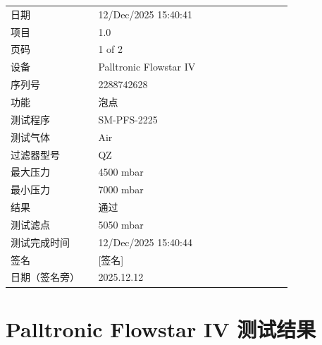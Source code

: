 \documentclass[UTF8,10pt,a4paper,fontset=fandol]{ctexart}
\newcommand{\fieldvalue}[1]{#1}
\newcommand{\handwritten}[1]{#1}
\begin{document}
\begin{tabular}{@{}p{0.28\linewidth}p{0.62\linewidth}@{}}
日期 &
\fieldvalue{12/Dec/2025 15:40:41}
\\
项目 &
\fieldvalue{1.0}
\\
页码 &
\fieldvalue{1 of 2}
\\
设备 &
\fieldvalue{Palltronic Flowstar IV}
\\
序列号 &
\fieldvalue{2288742628}
\\
功能 &
\fieldvalue{泡点}
\\
测试程序 &
\fieldvalue{SM-PFS-2225}
\\
测试气体 &
\fieldvalue{Air}
\\
过滤器型号 &
\fieldvalue{QZ}
\\
最大压力 &
\fieldvalue{4500 mbar}
\\
最小压力 &
\fieldvalue{7000 mbar}
\\
结果 &
\fieldvalue{通过}
\\
测试滤点 &
\fieldvalue{5050 mbar}
\\
测试完成时间 &
\fieldvalue{12/Dec/2025 15:40:44}
\\
签名 &
\fieldvalue{\handwritten{[签名]}}
\\
日期（签名旁） &
\fieldvalue{\handwritten{2025.12.12}}
\end{tabular}

\vspace{1em}


\section*{Palltronic Flowstar IV 测试结果}
\end{document}
